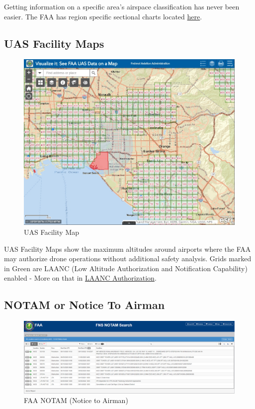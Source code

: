 \documentclass[
]{book}
\begin{document}
Getting information on a specific area's airspace classification has never been easier. The FAA has region specific sectional charts located \href{https://www.faa.gov/air_traffic/flight_info/aeronav/digital_products/vfr/}{here}.

\hypertarget{uas-facility-maps}{%
\subsection{UAS Facility Maps}\label{uas-facility-maps}}

\begin{figure}

{\centering \includegraphics[width=0.9\linewidth]{images/facility-map} 

}

\caption{UAS Facility Map}\label{fig:facility-map}
\end{figure}

UAS Facility Maps show the maximum altitudes around airports where the FAA may authorize drone operations without additional safety analysis. Grids marked in Green are LAANC (Low Altitude Authorization and Notification Capability) enabled - More on that in \protect\hyperlink{ch-LAANC}{LAANC Authorization}.

\hypertarget{notam-or-notice-to-airman}{%
\subsection{NOTAM or Notice To Airman}\label{notam-or-notice-to-airman}}

\begin{figure}
\centering
\includegraphics{images/FAA-Notam.png}
\caption{FAA NOTAM (Notice to Airman)}
\end{figure}
\end{document}
